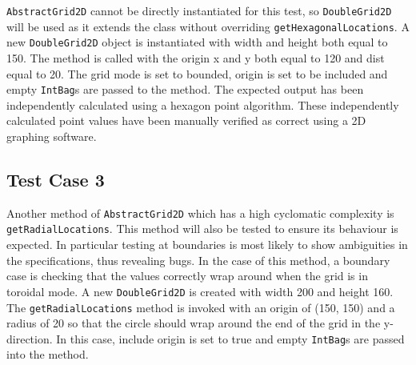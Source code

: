 \documentclass[11pt]{article}
\begin{document}
\texttt{AbstractGrid2D} cannot be directly instantiated for this test, so \texttt{DoubleGrid2D} will be used as it extends the class without overriding \texttt{getHexagonalLocations}.
A new \texttt{DoubleGrid2D} object is instantiated with width and height both equal to 150.
The method is called with the origin x and y both equal to 120 and dist equal to 20.
The grid mode is set to bounded, origin is set to be included and empty \texttt{IntBag}s are passed to the method.
The expected output has been independently calculated using a hexagon point algorithm.
These independently calculated point values have been manually verified as correct using a 2D graphing software.

\subsection{Test Case 3}
Another method of \texttt{AbstractGrid2D} which has a high cyclomatic complexity is \texttt{getRadialLocations}.
This method will also be tested to ensure its behaviour is expected.
In particular testing at boundaries is most likely to show ambiguities in the specifications\cite[pp.25]{lessons_book}, thus revealing bugs.
In the case of this method, a boundary case is checking that the values correctly wrap around when the grid is in toroidal mode.
A new \texttt{DoubleGrid2D} is created with width 200 and height 160.
The \texttt{getRadialLocations} method is invoked with an origin of (150, 150) and a radius of 20 so that the circle should wrap around the end of the grid in the y-direction.
In this case, include origin is set to true and empty \texttt{IntBag}s are passed into the method.
\\
\end{document}
